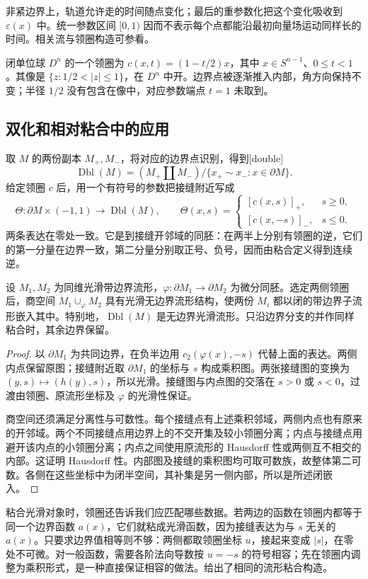非紧边界上，轨道允许走的时间随点变化；最后的重参数化把这个变化吸收到 \(\varepsilon(x)\) 中。统一参数区间 \([0,1)\) 因而不表示每个点都能沿最初向量场运动同样长的时间。相关流与领圈构造可参看\cite[第217--223页，定理9.20、9.24、9.25]{Lee2012Smooth}。

\begin{example}\label{g2:exm:disk-collar}
	闭单位球 \(D^n\) 的一个领圈为 \(c(x,t)=(1-t/2)x\)，其中 \(x\in S^{n-1}\)、\(0\le t<1\)。其像是 \(\{z:1/2<|z|\le1\}\)，在 \(D^n\) 中开。边界点被逐渐推入内部，角方向保持不变；半径 \(1/2\) 没有包含在像中，对应参数端点 \(t=1\) 未取到。
\end{example}

\subsection{双化和相对粘合中的应用}
\label{g2:subsec:1504:03}

取 \(M\) 的两份副本 \(M_+,M_-\)，将对应的边界点识别，得到[double]
\[
	\operatorname{Dbl}(M)=(M_+\amalg M_-)/\{x_+\sim x_-:x\in\partial M\}.
\]
给定领圈 \(c\) 后，用一个有符号的参数把接缝附近写成
\[
	\Theta:\partial M\times(-1,1)\longrightarrow\operatorname{Dbl}(M),\qquad
	\Theta(x,s)=\begin{cases}
		[c(x,s)]_+,&s\ge0,\\
		[c(x,-s)]_-,&s\le0.
	\end{cases}
\]
两条表达在零处一致。它是到接缝开邻域的同胚：在两半上分别有领圈的逆，它们的第一分量在边界一致，第二分量分别取正号、负号，因而由粘合定义得到连续逆。

\begin{proposition}\label{g2:prop:smooth-boundary-gluing}
	设 \(M_1,M_2\) 为同维光滑带边界流形，\(\varphi:\partial M_1\to\partial M_2\) 为微分同胚。选定两侧领圈后，商空间 \(M_1\cup_\varphi M_2\) 具有光滑无边界流形结构，使两份 \(M_i\) 都以闭的带边界子流形嵌入其中。特别地，\(\operatorname{Dbl}(M)\) 是无边界光滑流形。只沿边界分支的并作同样粘合时，其余边界保留。
\end{proposition}
\begin{proof}
	以 \(\partial M_1\) 为共同边界，在负半边用 \(c_2(\varphi(x),-s)\) 代替上面的表达。两侧内点保留原图；接缝附近取 \(\partial M_1\) 的坐标与 \(s\) 构成乘积图。两张接缝图的变换为 \((y,s)\mapsto(h(y),s)\)，所以光滑。接缝图与内点图的交落在 \(s>0\) 或 \(s<0\)，过渡由领圈、原流形坐标及 \(\varphi\) 的光滑性保证。

	商空间还须满足分离性与可数性。每个接缝点有上述乘积邻域，两侧内点也有原来的开邻域。两个不同接缝点用边界上的不交开集及较小领圈分离；内点与接缝点用避开该内点的小领圈分离；内点之间使用原流形的 Hausdorff 性或两侧互不相交的内部。这证明 Hausdorff 性。内部图及接缝的乘积图均可取可数族，故整体第二可数。各侧在这些坐标中为闭半空间，其补集是另一侧内部，所以是所述闭嵌入。
\end{proof}

粘合光滑对象时，领圈还告诉我们应匹配哪些数据。若两边的函数在领圈内都等于同一个边界函数 \(a(x)\)，它们就粘成光滑函数，因为接缝表达为与 \(s\) 无关的 \(a(x)\)。只要求边界值相等则不够：两侧都取领圈坐标 \(u\)，接起来变成 \(|s|\)，在零处不可微。对一般函数，需要各阶法向导数按 \(u=-s\) 的符号相容；先在领圈内调整为乘积形式，是一种直接保证相容的做法。\cite[第224--225页，定理9.29]{Lee2012Smooth}给出了相同的流形粘合构造。
